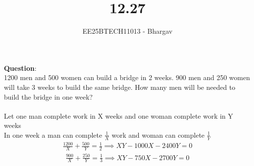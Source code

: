 \documentclass[journal]{IEEEtran}
\begin{document}

\vspace{3cm}

\title{12.27}
\author{EE25BTECH11013 - Bhargav}
\maketitle
    {\let\newpage\relax\maketitle}

\renewcommand{\thefigure}{\theenumi}
\renewcommand{\thetable}{\theenumi}
\setlength{\intextsep}{10pt} %

\renewcommand{\thetable}{\theenumi}

\textbf{Question}: \\
1200 men and 500 women can build a bridge in 2 weeks. 900 men and 250 women will take 3 weeks to build the same bridge. How many men will be needed to build the bridge in one week? \\
\solution \\
Let one man complete work in X weeks and one woman complete work in Y weeks\\
In one week a man can complete $\frac{1}{X}$ work and woman can complete $\frac{1}{Y}$
\begin{align}
\frac{1200}{X} + \frac{500}{Y} = \frac{1}{2} \implies XY - 1000X - 2400Y = 0 \label{eq:1}
\end{align}
\begin{align}
\frac{900}{X} + \frac{250}{Y} = \frac{1}{3} \implies XY - 750X - 2700Y = 0 \label{eq:2}
\end{align}
\end{document}
